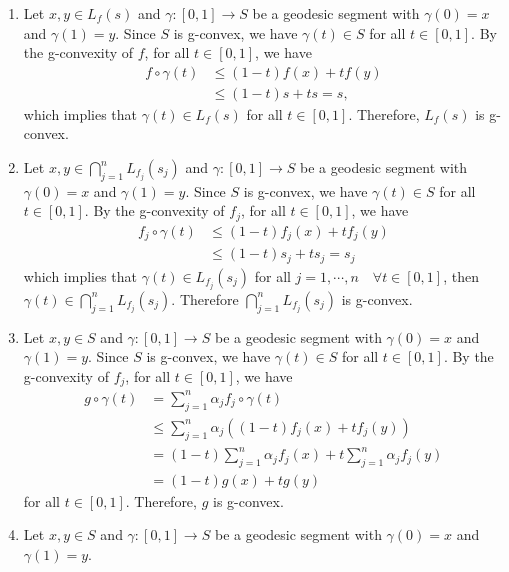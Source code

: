 \documentclass[en, oneside]{assignment}
\begin{document}
\begin{sol}
    \begin{enumerate}[label=(\arabic*)]
        \item Let $x, y \in L_f(s)$ and $\gamma : [0, 1] \rightarrow S$ be a geodesic segment with $\gamma(0) = x$ and $\gamma(1) = y$. 
        Since $S$ is g-convex, we have $\gamma(t) \in S$ for all $t \in [0, 1]$. By the g-convexity of $f$, for all $t \in [0, 1]$, we have
        \begin{align*}
            f \circ \gamma(t) &\leq (1-t) f(x) + t f(y) \\
            &\leq (1-t) s + t s = s,
        \end{align*}
        which implies that $\gamma(t) \in L_f(s)$ for all $t \in [0, 1]$. Therefore, $L_f(s)$ is g-convex.
        \item Let $x, y \in \bigcap_{j=1}^n L_{f_j}(s_j)$ and $\gamma : [0, 1] \rightarrow S$ be a geodesic segment with $\gamma(0) = x$ and $\gamma(1) = y$.
        Since $S$ is g-convex, we have $\gamma(t) \in S$ for all $t \in [0, 1]$. By the g-convexity of $f_j$, for all $t \in [0, 1]$, we have
        \begin{align*}
            f_j \circ \gamma(t) &\leq (1-t) f_j(x) + t f_j(y) \\
            &\leq (1-t) s_j + t s_j = s_j
        \end{align*}
        which implies that $\gamma(t) \in L_{f_j}(s_j)$ for all $j = 1, \cdots, n \quad \forall t \in [0, 1]$, then $\gamma(t) \in \bigcap _{j=1}^n L_{f_j}(s_j)$.
        Therefore $\bigcap _{j=1}^n L_{f_j}(s_j)$ is g-convex.
        \item Let $x, y \in S$ and $\gamma : [0, 1] \rightarrow S$ be a geodesic segment with $\gamma(0) = x$ and $\gamma(1) = y$.
        Since $S$ is g-convex, we have $\gamma(t) \in S$ for all $t \in [0, 1]$. By the g-convexity of $f_j$, for all $t \in [0, 1]$, we have
        \begin{align*}
            g \circ \gamma(t) &= \sum_{j=1}^n \alpha_j f_j \circ \gamma(t) \\
            &\leq \sum_{j=1}^n \alpha_j ( (1-t) f_j(x) + t f_j(y) ) \\
            &= (1-t) \sum_{j=1}^n \alpha_j f_j(x) + t \sum_{j=1}^n \alpha_j f_j(y) \\
            &= (1-t) g(x) + t g(y)
        \end{align*}
        for all $t \in [0, 1]$. Therefore, $g$ is g-convex.
        \item Let $x, y \in S$ and $\gamma : [0, 1] \rightarrow S$ be a geodesic segment with $\gamma(0) = x$ and $\gamma(1) = y$.

\end{enumerate}
\end{sol}
\end{document}
